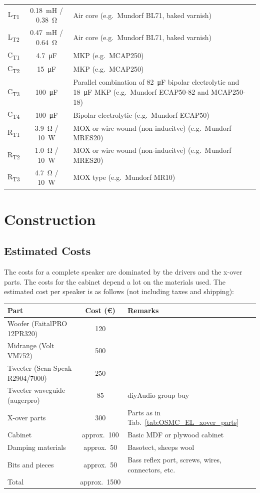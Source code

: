 \documentclass[12pt,a4paper]{article}
\providecommand{\tabl}[1]{Tab.~\ref{tab:#1}}
\providecommand{\inductor}[1]{L\textsubscript{#1}}
\providecommand{\capacitor}[1]{C\textsubscript{#1}}
\providecommand{\resistor}[1]{R\textsubscript{#1}}
\begin{document}
\begin{table}[p]
\begin{tabular}{ccp{}}
\inductor{T1}	& \SI{0.18}{mH} / \SI{0.38}{\ohm}	& Air core (e.g.~Mundorf BL71, baked varnish)\\
\inductor{T2}	& \SI{0.47}{mH} / \SI{0.64}{\ohm}	& Air core (e.g.~Mundorf BL71, baked varnish)\\
\capacitor{T1}	& \SI{4.7}{\micro F}			& MKP (e.g.~MCAP250)\\
\capacitor{T2}	& \SI{15}{\micro F}			& MKP (e.g.~MCAP250)\\
\capacitor{T3}	& \SI{100}{\micro F}			& Parallel combination of \SI{82}{\micro F} bipolar electrolytic and \SI{18}{\micro F} MKP (e.g.~Mundorf ECAP50-82 and MCAP250-18)\\
\capacitor{T4}	& \SI{100}{\micro F}			& Bipolar electrolytic (e.g.~Mundorf ECAP50)\\
\resistor{T1}	& \SI{3.9}{\ohm} / \SI{10}{W}		& MOX or wire wound (non-inducitve) (e.g.~Mundorf MRES20)\\
\resistor{T2}	& \SI{1.0}{\ohm} / \SI{10}{W}		& MOX or wire wound (non-inducitve) (e.g.~Mundorf MRES20)\\
\resistor{T3}	& \SI{4.7}{\ohm} / \SI{10}{W}		& MOX type (e.g.~Mundorf MR10)\\
\bottomrule
\end{tabular}
\end{table}



\section{Construction}

\subsection{Estimated Costs}
The costs for a complete speaker are dominated by the drivers and the x-over parts. The costs for the cabinet depend a lot on the materials used. The estimated cost per speaker is as follows (not including taxes and shipping):

\begin{tabular}{lcp{}} 
\toprule
Part & Cost (\euro) & Remarks\\ 
\midrule 
Woofer (FaitalPRO 12PR320)	&	120	\\
Midrange (Volt VM752)		&	500 \\
Tweeter (Scan Speak R2904/7000)	&	250	\\
Tweeter waveguide (augerpro)	&	85	& diyAudio group buy\cite{augerpro_groupbuy} \\
X-over parts			&	300	& Parts as in \tabl{OSMC_EL_xover_parts} \\
Cabinet				&	approx.~100	& Basic MDF or plywood cabinet \\
Damping materials		&	approx.~50	& Basotect, sheeps wool \\
Bits and pieces			&	approx.~50 	& Bass reflex port, screws, wires, connectors, etc. \\
\midrule 
Total				&	approx.~1500 \\
\bottomrule
\end{tabular}
\end{document}
